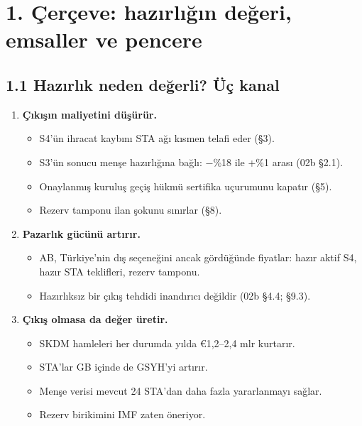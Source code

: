 \hypertarget{02c_hazirlik-1-uxe7eruxe7eve-hazux131rlux131ux11fux131n-deux11feri-emsaller-ve-pencere}{%
\section{1. Çerçeve: hazırlığın değeri, emsaller ve pencere}\label{02c_hazirlik-1-uxe7eruxe7eve-hazux131rlux131ux11fux131n-deux11feri-emsaller-ve-pencere}}

\hypertarget{02c_hazirlik-11-hazux131rlux131k-neden-deux11ferli-uxfcuxe7-kanal}{%
\subsection{1.1 Hazırlık neden değerli? Üç kanal}\label{02c_hazirlik-11-hazux131rlux131k-neden-deux11ferli-uxfcuxe7-kanal}}

\begin{enumerate}
\def\labelenumi{\arabic{enumi}.}
\tightlist
\item
  \textbf{Çıkışın maliyetini düşürür.}

  \begin{itemize}
  \tightlist
  \item
    S4'ün ihracat kaybını STA ağı kısmen telafi eder (§3).
  \item
    S3'ün sonucu menşe hazırlığına bağlı: −\%18 ile +\%1 arası (02b §2.1).
  \item
    Onaylanmış kuruluş geçiş hükmü sertifika uçurumunu kapatır (§5).
  \item
    Rezerv tamponu ilan şokunu sınırlar (§8).
  \end{itemize}
\item
  \textbf{Pazarlık gücünü artırır.}

  \begin{itemize}
  \tightlist
  \item
    AB, Türkiye'nin dış seçeneğini ancak gördüğünde fiyatlar: hazır aktif S4, hazır STA teklifleri, rezerv tamponu.
  \item
    Hazırlıksız bir çıkış tehdidi inandırıcı değildir (02b §4.4; §9.3).
  \end{itemize}
\item
  \textbf{Çıkış olmasa da değer üretir.}

  \begin{itemize}
  \tightlist
  \item
    SKDM hamleleri her durumda yılda €1,2--2,4 mlr kurtarır.
  \item
    STA'lar GB içinde de GSYH'yi artırır.
  \item
    Menşe verisi mevcut 24 STA'dan daha fazla yararlanmayı sağlar.
  \item
    Rezerv birikimini IMF zaten öneriyor.
  \end{itemize}
\end{enumerate}

